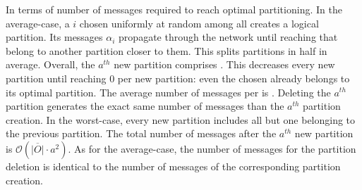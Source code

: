 \begin{asparadesc}
In terms of number of messages required to reach optimal
partitioning. In the average-case, a \process $i$ chosen uniformly at
random among all \processes creates a logical partition. Its messages
$\alpha_i$ propagate through the network until reaching \processes
that belong to another partition closer to them. This splits
partitions in half in average. Overall, the $a^{th}$ new partition
comprises  \processes. This decreases every new partition
until reaching $0$ \processes per new partition: even the chosen
\process already belongs to its optimal partition. The average number
of messages per \process is
.  Deleting the
$a^{th}$ partition generates the exact same number of messages than
the $a^{th}$ partition creation.  In the
worst-case, every new partition includes all but one \process
belonging to the previous partition. The total number of messages
after the $a^{th}$ new partition is $\mathcal{O}(\overline{|O|}\cdot
a^2)$. As for the average-case, the number of messages for the
partition deletion is identical to the number of messages of the
corresponding partition creation.

\noindent {}

\end{asparadesc}

